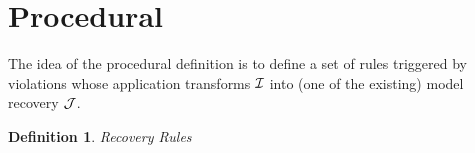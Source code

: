 \documentclass[draft]{article}
\newtheorem{definition}{Definition}
\begin{document}
\section{Procedural}

The idea of the procedural definition is to define a set of rules triggered by violations whose application transforms $\Imc$ into (one of the existing) model recovery $\Jmc$.

\begin{definition}{Recovery Rules}
\label{def:recovery_rules}

\begin{prooftree}
\end{prooftree}

\begin{prooftree}
\end{prooftree}

\begin{prooftree}
\end{prooftree}

\begin{prooftree}
\end{prooftree}


\end{definition}
\end{document}
